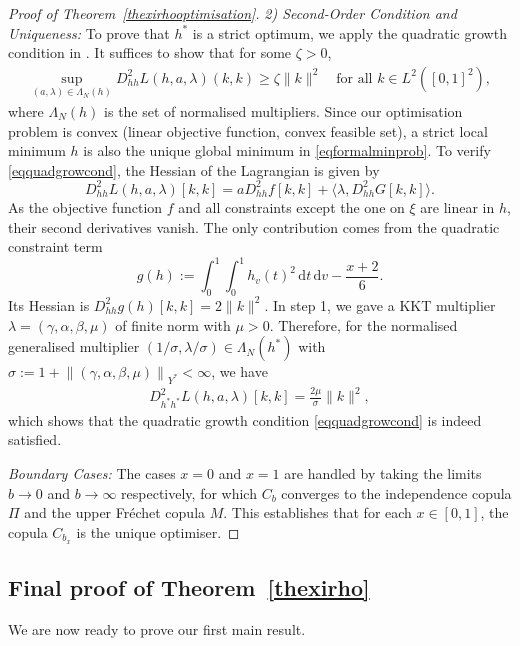 \documentclass{article}
\theoremstyle{plain}
\theoremstyle{definition}
\newcommand{\de}{\mathrm{\,d}}
\begin{document}
\begin{proof}[Proof of Theorem~\ref{thexirhooptimisation}]
\emph{2) Second-Order Condition and Uniqueness:}
To prove that $h^*$ is a strict optimum, we apply the quadratic growth condition in \cite[Thm.~3.63]{bonnans2013perturbation}. It suffices to show that for some $\zeta > 0$,
\begin{align}\label{eqquadgrowcond}
    \sup_{(a,\lambda)\in\Lambda_{N}(h)} D_{hh}^{2}L(h,a,\lambda)(k,k) \ge \zeta\|k\|^{2} \quad \text{for all } k \in L^2([0,1]^2),
\end{align} 
where $\Lambda_{N}(h)$ is the set of normalised multipliers.
Since our optimisation problem is convex (linear objective function, convex feasible set), a strict local minimum \(h\) is also the unique global minimum in \eqref{eqformalminprob}.
To verify \eqref{eqquadgrowcond}, the Hessian of the Lagrangian is given by
\[
  D_{hh}^{2}L(h,a,\lambda)[k,k] = a D_{hh}^2 f[k,k] + \langle \lambda, D_{hh}^2 G[k,k] \rangle. 
\]
As the objective function $f$ and all constraints except the one on $\xi$ are linear in $h$, their second derivatives vanish. The only contribution comes from the quadratic constraint term
\[
g(h) := \int_0^1\int_0^1 h_v(t)^2\de t \de v - \frac{x+2}{6}.
\]
Its Hessian is $D_{hh}^2 g(h)[k,k] = 2\|k\|^2.$
In step 1, we gave a KKT multiplier $\lambda=(\gamma,\alpha,\beta,\mu)$ of finite norm with $\mu > 0$.
Therefore, for the normalised generalised multiplier $(1/\sigma, \lambda/\sigma) \in \Lambda_N(h^*)$ with $\sigma:= 1+ \left\lVert (\gamma,\alpha,\beta,\mu)\right\rVert_{Y^*}<\infty$, we have
\begin{align}\label{seuffsecordcond}
    D_{h^*h^*}^{2}L(h,a,\lambda)[k,k] = \frac{2\mu}{\sigma} \|k\|^2
,\end{align}
which shows that the quadratic growth condition \eqref{eqquadgrowcond} is indeed satisfied.

\emph{Boundary Cases:} The cases $x=0$ and $x=1$ are handled by taking the limits $b \to 0$ and $b \to \infty$ respectively, for which $C_b$ converges to the independence copula $\Pi$ and the upper Fréchet copula $M$. This establishes that for each $x \in [0,1]$, the copula $C_{b_x}$ is the unique optimiser.
\end{proof}

\subsection{Final proof of Theorem~\ref{thexirho}}

We are now ready to prove our first main result.
\end{document}
